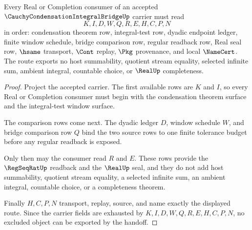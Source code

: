 \begin{theorem}
\label{thm:cauchy-condensation-integral-bridge-obligation-handoff}
Every Real or Completion consumer of an accepted $\CauchyCondensationIntegralBridgeUp$ carrier must read
$$
K,I,D,W,Q,R,E,H,C,P,N
$$
in order: condensation theorem row, integral-test row, dyadic endpoint ledger, finite window schedule, bridge comparison row, regular readback row, Real seal row, $\hsame$ transport, $\Cont$ replay, $\Pkg$ provenance, and local $\NameCert$. The route exports no host summability, quotient stream equality, selected infinite sum, ambient integral, countable choice, or $\RealUp$ completeness.
\end{theorem}
\begin{proof}
Project the accepted carrier. The first available rows are $K$ and $I$, so every Real or Completion consumer must begin with the condensation theorem surface and the integral-test window surface.

The comparison rows come next. The dyadic ledger $D$, window schedule $W$, and bridge comparison row $Q$ bind the two source rows to one finite tolerance budget before any regular readback is exposed.

Only then may the consumer read $R$ and $E$. These rows provide the $\RegSeqRatUp$ readback and the $\RealUp$ seal, and they do not add host summability, quotient stream equality, a selected infinite sum, an ambient integral, countable choice, or a completeness theorem.

Finally $H,C,P,N$ transport, replay, source, and name exactly the displayed route. Since the carrier fields are exhausted by $K,I,D,W,Q,R,E,H,C,P,N$, no excluded object can be exported by the handoff.
\end{proof}




